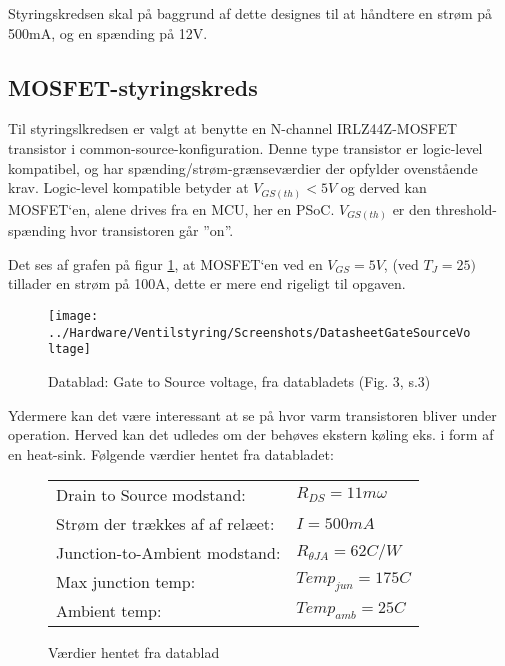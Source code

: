 Styringskredsen skal på baggrund af dette designes til at håndtere en strøm på 500mA, og en spænding på 12V. 


\newpage
\subsection{MOSFET-styringskreds}
Til styringslkredsen er valgt at benytte en N-channel IRLZ44Z-MOSFET transistor i common-source-konfiguration. Denne type transistor er logic-level kompatibel, og har spænding/strøm-grænseværdier der opfylder ovenstående krav.  
Logic-level kompatible betyder at $ V_{GS(th)} < 5V $ og derved kan MOSFET`en, alene drives fra en MCU, her en PSoC.
$ V_{GS(th)} $ er den threshold-spænding hvor transistoren går ”on”.


Det ses af grafen på figur \ref{screenshot:GateToSourceVoltage}, at MOSFET`en ved en $ V_{GS} = 5V $, (ved $T_J = 25)$ tillader en strøm på 100A, dette er mere end rigeligt til opgaven.

\begin{figure}[!h]
	\centering
	\texttt{[image: ../Hardware/Ventilstyring/Screenshots/DatasheetGateSourceVoltage]}
	\caption{Datablad: Gate to Source voltage, fra databladets (Fig. 3, s.3)}
	\label{screenshot:GateToSourceVoltage}
\end{figure}

Ydermere kan det være interessant at se på hvor varm transistoren bliver under operation. Herved kan det udledes om der behøves ekstern køling eks. i form af en heat-sink.
Følgende værdier hentet fra databladet: 

\begin{figure}[!h]
	\begin{center}
		\begin{tabular}{ l l }
 			Drain to Source modstand:          & $R_{DS}=11 m\omega$ \\ 
 			Strøm der trækkes af af relæet:    & $I = 500 mA$ \\  
 			Junction-to-Ambient modstand:      & $R_{\theta JA}=62 C/W$ \\   
 			Max junction temp:                 & $Temp_{jun}=175 C$ \\
 			Ambient temp:                      & $Temp_{amb}=25 C$ \\
		\end{tabular}
	\end{center}
\caption{Værdier hentet fra datablad}
\end{figure}


